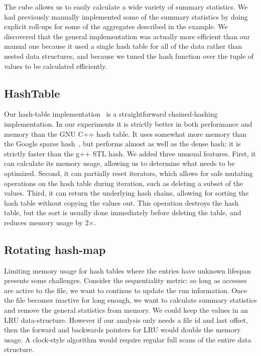The cube allows us to easily calculate a wide variety of summary
statistics.  We had previously manually implemented some of the
summary statistics by doing explicit roll-ups for some of the
aggregates described in the example.  We discovered that the general
implementation was actually more efficient than our manual one because
it used a single hash table for all of the data rather than nested
data structures, and because we tuned the hash function over the tuple
of values to be calculated efficiently.

\subsection{HashTable}

Our hash-table implementation~\cite{DSOpenSource} is a straightforward
chained-hashing implementation.  In our experiments it is strictly
better in both performance and memory than the GNU C++ hash table.  It
uses somewhat more memory than the Google sparse
hash~\cite{google-sparse-hash}, but performs almost as well as the
dense hash; it is strictly faster than the g++ STL hash.  We added
three unusual features.  First, it can calculate its memory usage,
allowing us to determine what needs to be optimized.  Second, it can
partially reset iterators, which allows for safe mutating operations
on the hash table during iteration, such as deleting a subset of the
values.  Third, it can return the underlying hash chains, allowing for
sorting the hash table without copying the values out.  This operation destroys
the hash table, but the sort is usually done immediately before deleting the
table, and reduces memory usage by 2$\times$.

\subsection{Rotating hash-map}

Limiting memory usage for hash tables where the entries have unknown
lifespan presents some challenges. Consider the sequentiality metric:
so long as accesses are active to the file, we want to continue to
update the run information.  Once the file becomes inactive for long
enough, we want to calculate summary statistics and remove the general
statistics from memory.  We could keep the values in an LRU
data-structure.  However if our analysis only needs a file id and last
offset, then the forward and backwards pointers for LRU would double
the memory usage.  A clock-style algorithm would
require regular full scans of the entire data structure.

